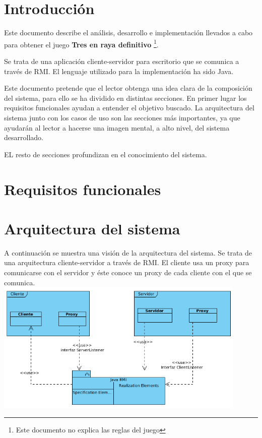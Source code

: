 \documentclass[a4paper,11pt,oneside]{article}
\begin{document}

\clearpage
\section{Introducción}

Este documento describe el análisis, desarrollo e implementación llevados a cabo para obtener
el juego \textbf{Tres en raya definitivo} \footnote{Este documento no explica las reglas del juego}.

Se trata de una aplicación cliente-servidor para escritorio que se comunica a través de RMI.
El lenguaje utilizado para la implementación ha sido Java.

Este documento pretende que el lector obtenga una idea clara de la composición del sistema, para ello
se ha dividido en distintas secciones. En primer lugar los requisitos funcionales ayudan a entender el objetivo
buscado. La arquitectura del sistema junto con los casos de uso son las secciones más importantes, ya
que ayudarán al lector a hacerse una imagen mental, a alto nivel, del sistema desarrollado.

EL resto de secciones profundizan en el conocimiento del sistema.

\clearpage

\pagestyle{fancy}

\section{Requisitos funcionales}
% 


\section{Arquitectura del sistema}

A continuación se muestra una visión de la arquitectura del sistema. Se trata de
una arquitectura cliente-servidor a través de RMI. El cliente usa un
proxy para comunicarse con el servidor y éste conoce un proxy de cada cliente con el
que se comunica.
\\
\includegraphics[width=0.9\textwidth]{img/arquitectura/arquitectura.png}\\[1cm]
\end{document}
